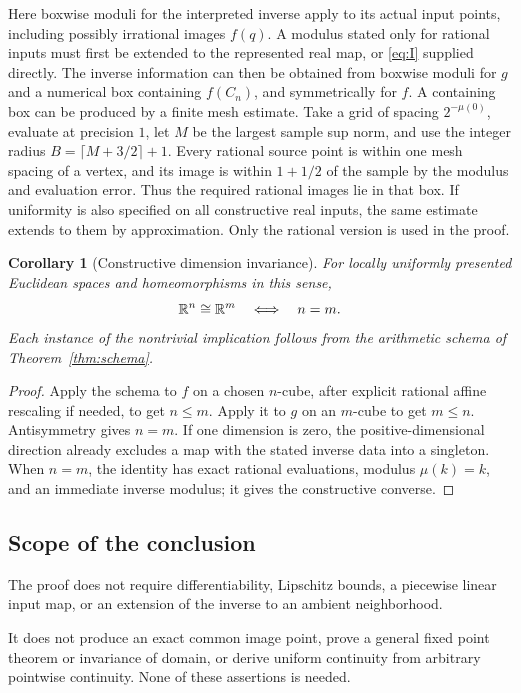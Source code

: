 \documentclass[11pt,a4paper]{article}
\newtheorem{corollary}[theorem]{Corollary}
\theoremstyle{definition}
\begin{document}
Here boxwise moduli for the interpreted inverse apply to its
actual input points, including possibly irrational images $f(q)$.
A modulus stated only for rational inputs must first be extended
to the represented real map, or \eqref{eq:I} supplied directly.
The inverse information can then be obtained from boxwise moduli
for $g$ and a numerical box containing $f(C_n)$, and
symmetrically for $f$. A containing box can be produced
by a finite mesh estimate. Take a grid of spacing
$2^{-\mu(0)}$, evaluate at precision $1$, let $M$ be the
largest sample sup norm, and use the integer radius
$B=\lceil M+3/2\rceil+1$. Every rational source point is
within one mesh spacing of a vertex, and its image is
within $1+1/2$ of the sample by the modulus and evaluation
error. Thus the required rational images lie in that box.
If uniformity is also specified on all constructive real
inputs, the same estimate extends to them by approximation.
Only the rational version is used in the proof.

\begin{corollary}[Constructive dimension invariance]\label{cor:dimension}
For locally uniformly presented Euclidean spaces and
homeomorphisms in this sense,
\[
                  \mathbb R^n\cong\mathbb R^m\quad\Longleftrightarrow\quad n=m.
\]
Each instance of the nontrivial implication follows from
the arithmetic schema of Theorem~\ref{thm:schema}.
\end{corollary}
\begin{proof}
Apply the schema to $f$ on a chosen $n$-cube, after
explicit rational affine rescaling if needed, to get
$n\leq m$. Apply it to $g$ on an $m$-cube to get
$m\leq n$. Antisymmetry gives $n=m$.
If one dimension is zero, the positive-dimensional
direction already excludes a map with the stated inverse
data into a singleton.
When $n=m$, the identity has exact rational evaluations,
modulus $\mu(k)=k$, and an immediate inverse modulus;
it gives the constructive converse.
\end{proof}

\subsection{Scope of the conclusion}
The proof does not require differentiability, Lipschitz
bounds, a piecewise linear input map, or an extension of
the inverse to an ambient neighborhood.

It does not produce an exact common image point, prove a
general fixed point theorem or invariance of domain, or
derive uniform continuity from arbitrary pointwise
continuity. None of these assertions is needed.
\end{document}
